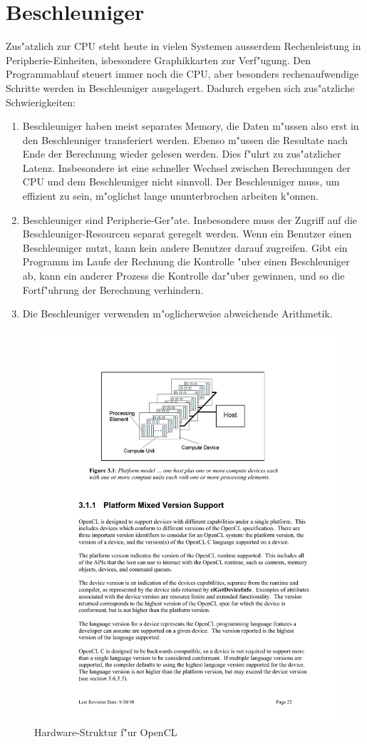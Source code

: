 \section{Beschleuniger}
Zus"atzlich zur CPU steht heute in vielen Systemen ausserdem Rechenleistung
in Peripherie-Einheiten, isbesondere Graphikkarten zur Verf"ugung.
Den Programmablauf steuert immer noch die CPU, aber besonders
rechenaufwendige Schritte werden in Beschleuniger ausgelagert.
Dadurch ergeben sich zus"atzliche Schwierigkeiten:
\begin{enumerate}
\item Beschleuniger haben meist separates Memory, die Daten m"ussen also
erst in den Beschleuniger transferiert werden. Ebenso m"ussen die Resultate
nach Ende der Berechnung wieder gelesen werden.
Dies f"uhrt zu zus"atzlicher Latenz.
Insbesondere ist eine schneller Wechsel zwischen Berechnungen der CPU 
und dem Beschleuniger nicht sinnvoll.
Der Beschleuniger muss, um effizient zu sein, m"oglichst lange ununterbrochen
arbeiten k"onnen.
\item Beschleuniger sind Peripherie-Ger"ate.
Insbesondere muss der Zugriff auf die Beschleuniger-Resourcen separat
geregelt werden. 
Wenn ein Benutzer einen Beschleuniger nutzt, kann kein andere Benutzer
darauf zugreifen. Gibt ein Programm im Laufe der Rechnung die Kontrolle
"uber einen Beschleuniger ab, kann ein anderer Prozess die Kontrolle dar"uber
gewinnen, und so die Fortf"uhrung der Berechnung verhindern.
\item Die Beschleuniger verwenden m"oglicherweise abweichende Arithmetik.
\end{enumerate}
\begin{figure}
\begin{center}
\includegraphics[width=0.8\hsize]{images/opencl-platform.pdf}
\end{center}
\caption{Hardware-Struktur f"ur OpenCL\label{hardware:opencl}}
\end{figure}

